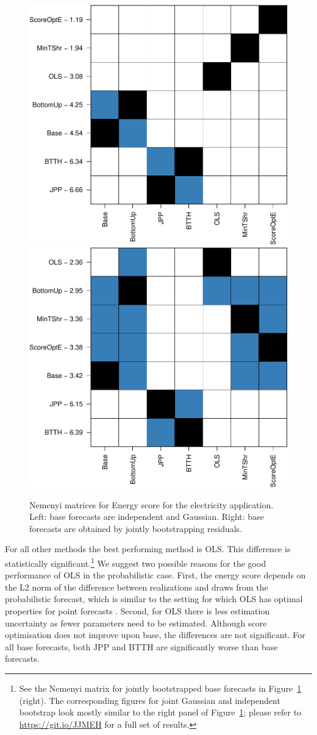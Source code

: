 \documentclass[a4paper,12pt]{article}
\theoremstyle{definition}
\begin{document}
\begin{figure}[!htb]
  \centerline{\includegraphics[width=.4\textwidth]{nemenyi_ig.pdf}\includegraphics[width=.4\textwidth]{nemenyi_jb.pdf}}
  \caption{Nemenyi matrices for Energy score for the electricity application. Left: base forecasts are independent and Gaussian. Right: base forecasts are obtained by jointly bootstrapping residuals.}\label{fig:nem_app}
\end{figure}


For all other methods the best performing method is OLS. This difference is statistically significant.\footnote{See the Nemenyi matrix for jointly bootstrapped base forecasts in Figure~\ref{fig:nem_app} (right). The corresponding figures for joint Gaussian and independent bootstrap look mostly similar to the right panel of Figure~\ref{fig:nem_app}; please refer to \url{https://git.io/JJMEH} for a full set of results.} {\color{red}We suggest two possible reasons for the good performance of OLS in the probabilistic case. First, the energy score depends on the L2 norm of the difference between realizations and draws from the probabilistic forecast, which is similar to the setting for which OLS has optimal properties for point forecasts \citep[see][]{PanEtAl2020_Geometry}. Second, for OLS there is less estimation uncertainty as fewer parameters need to be estimated.} Although score optimisation does not improve upon base, the differences are not significant. For all base forecasts, both JPP and BTTH are significantly worse than base forecasts.
\end{document}
